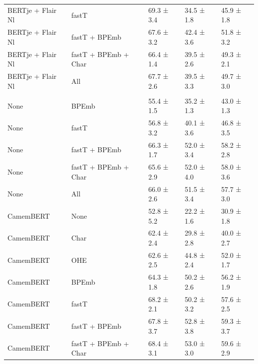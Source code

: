 \documentclass[12pt,a4paper,]{book}
\begin{document}
\begin{longtable}[t]{lllll}
\hspace{1em}BERTje + Flair Nl & fastT & 69.3 ±  3.4 & 34.5 ±  1.8 & 45.9 ±  1.8\\
\hspace{1em}BERTje + Flair Nl & fastT + BPEmb & 67.6 ±  3.2 & 42.4 ±  3.6 & 51.8 ±  3.2\\
\hspace{1em}BERTje + Flair Nl & fastT + BPEmb + Char & 66.4 ±  1.4 & 39.5 ±  2.6 & 49.3 ±  2.1\\
\hspace{1em}BERTje + Flair Nl & All & 67.7 ±  2.6 & 39.5 ±  3.3 & 49.7 ±  3.0\\
\addlinespace[0.3em]
\multicolumn{5}{l}{\textbf{French embeddings}}\\
\hspace{1em}None & BPEmb & 55.4 ±  1.5 & 35.2 ±  1.3 & 43.0 ±  1.3\\
\hspace{1em}None & fastT & 56.8 ±  3.2 & 40.1 ±  3.6 & 46.8 ±  3.5\\
\hspace{1em}None & fastT + BPEmb & 66.3 ±  1.7 & 52.0 ±  3.4 & 58.2 ±  2.8\\
\hspace{1em}None & fastT + BPEmb + Char & 65.6 ±  2.9 & 52.0 ±  4.0 & 58.0 ±  3.6\\
\hspace{1em}None & All & 66.0 ±  2.6 & 51.5 ±  3.4 & 57.7 ±  3.0\\
\hspace{1em}CamemBERT & None & 52.8 ±  5.2 & 22.2 ±  1.6 & 30.9 ±  1.8\\
\hspace{1em}CamemBERT & Char & 62.4 ±  2.4 & 29.8 ±  2.8 & 40.0 ±  2.7\\
\hspace{1em}CamemBERT & OHE & 62.6 ±  2.5 & 44.8 ±  2.4 & 52.0 ±  1.7\\
\hspace{1em}CamemBERT & BPEmb & 64.3 ±  1.8 & 50.2 ±  2.6 & 56.2 ±  1.9\\
\hspace{1em}CamemBERT & fastT & 68.2 ±  2.1 & 50.2 ±  3.2 & 57.6 ±  2.5\\
\hspace{1em}CamemBERT & fastT + BPEmb & 67.8 ±  3.7 & 52.8 ±  3.8 & 59.3 ±  3.7\\
\hspace{1em}CamemBERT & fastT + BPEmb + Char & 68.4 ±  3.1 & 53.0 ±  3.0 & 59.6 ±  2.9\\

\end{longtable}
\end{document}
